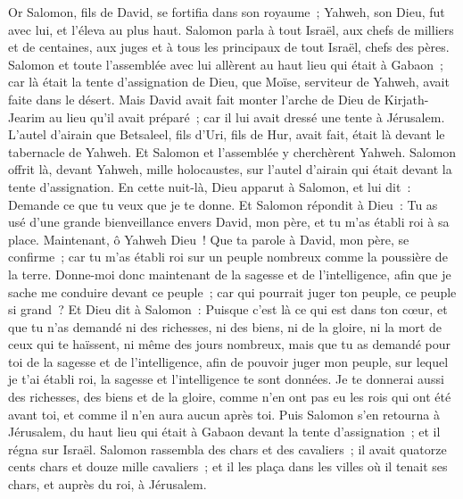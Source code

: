 \begin{multicols}{2}
\VerseOne{}Or Salomon, fils de David, se fortifia dans son royaume~; Yahweh, son Dieu, fut avec lui, et l'éleva au plus haut.
Salomon parla à tout Israël, aux chefs de milliers et de centaines, aux juges et à tous les principaux de tout Israël, chefs des pères.
Salomon et toute l'assemblée avec lui allèrent au haut lieu qui était à Gabaon~; car là était la tente d'assignation de Dieu, que Moïse, serviteur de Yahweh, avait faite dans le désert.
Mais David avait fait monter l'arche de Dieu de Kirjath-Jearim au lieu qu'il avait préparé~; car il lui avait dressé une tente à Jérusalem.
L'autel d'airain que Betsaleel, fils d'Uri, fils de Hur, avait fait, était là devant le tabernacle de Yahweh. Et Salomon et l'assemblée y cherchèrent Yahweh.
Salomon offrit là, devant Yahweh, mille holocaustes, sur l'autel d'airain qui était devant la tente d'assignation.
En cette nuit-là, Dieu apparut à Salomon, et lui dit~: Demande ce que tu veux que je te donne.
Et Salomon répondit à Dieu~: Tu as usé d'une grande bienveillance envers David, mon père, et tu m'as établi roi à sa place.
Maintenant, ô Yahweh Dieu~! Que ta parole à David, mon père, se confirme~; car tu m'as établi roi sur un peuple nombreux comme la poussière de la terre.
Donne-moi donc maintenant de la sagesse et de l'intelligence, afin que je sache me conduire devant ce peuple~; car qui pourrait juger ton peuple, ce peuple si grand~?
Et Dieu dit à Salomon~: Puisque c'est là ce qui est dans ton cœur, et que tu n'as demandé ni des richesses, ni des biens, ni de la gloire, ni la mort de ceux qui te haïssent, ni même des jours nombreux, mais que tu as demandé pour toi de la sagesse et de l'intelligence, afin de pouvoir juger mon peuple, sur lequel je t'ai établi roi,
la sagesse et l'intelligence te sont données. Je te donnerai aussi des richesses, des biens et de la gloire, comme n'en ont pas eu les rois qui ont été avant toi, et comme il n'en aura aucun après toi.
Puis Salomon s'en retourna à Jérusalem, du haut lieu qui était à Gabaon devant la tente d'assignation~; et il régna sur Israël.
Salomon rassembla des chars et des cavaliers~; il avait quatorze cents chars et douze mille cavaliers~; et il les plaça dans les villes où il tenait ses chars, et auprès du roi, à Jérusalem.

\end{multicols}
